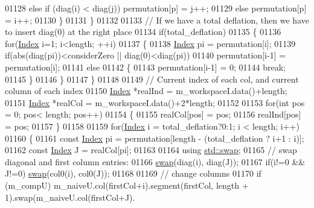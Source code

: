 \begin{DoxyCode}
01128         \textcolor{keywordflow}{else} \textcolor{keywordflow}{if} (diag(i) < diag(j)) permutation[p] = j++;
01129         \textcolor{keywordflow}{else}                        permutation[p] = i++;
01130       \}
01131     \}
01132     
01133     \textcolor{comment}{// If we have a total deflation, then we have to insert diag(0) at the right place}
01134     \textcolor{keywordflow}{if}(total\_deflation)
01135     \{
01136       \textcolor{keywordflow}{for}(\hyperlink{namespace_eigen_a62e77e0933482dafde8fe197d9a2cfde}{Index} i=1; i<length; ++i)
01137       \{
01138         \hyperlink{namespace_eigen_a62e77e0933482dafde8fe197d9a2cfde}{Index} pi = permutation[i];
01139         \textcolor{keywordflow}{if}(abs(diag(pi))<considerZero || diag(0)<diag(pi))
01140           permutation[i-1] = permutation[i];
01141         \textcolor{keywordflow}{else}
01142         \{
01143           permutation[i-1] = 0;
01144           \textcolor{keywordflow}{break};
01145         \}
01146       \}
01147     \}
01148     
01149     \textcolor{comment}{// Current index of each col, and current column of each index}
01150     \hyperlink{namespace_eigen_a62e77e0933482dafde8fe197d9a2cfde}{Index} *realInd = m\_workspaceI.data()+length;
01151     \hyperlink{namespace_eigen_a62e77e0933482dafde8fe197d9a2cfde}{Index} *realCol = m\_workspaceI.data()+2*length;
01152     
01153     \textcolor{keywordflow}{for}(\textcolor{keywordtype}{int} pos = 0; pos< length; pos++)
01154     \{
01155       realCol[pos] = pos;
01156       realInd[pos] = pos;
01157     \}
01158     
01159     \textcolor{keywordflow}{for}(\hyperlink{namespace_eigen_a62e77e0933482dafde8fe197d9a2cfde}{Index} i = total\_deflation?0:1; i < length; i++)
01160     \{
01161       \textcolor{keyword}{const} \hyperlink{namespace_eigen_a62e77e0933482dafde8fe197d9a2cfde}{Index} pi = permutation[length - (total\_deflation ? i+1 : i)];
01162       \textcolor{keyword}{const} \hyperlink{namespace_eigen_a62e77e0933482dafde8fe197d9a2cfde}{Index} J = realCol[pi];
01163       
01164       \textcolor{keyword}{using} \hyperlink{endian_8c_a3ca5ecd34b04d6a243c054ac3a57f68d}{std::swap};
01165       \textcolor{comment}{// swap diagonal and first column entries:}
01166       \hyperlink{endian_8c_a3ca5ecd34b04d6a243c054ac3a57f68d}{swap}(diag(i), diag(J));
01167       \textcolor{keywordflow}{if}(i!=0 && J!=0) \hyperlink{endian_8c_a3ca5ecd34b04d6a243c054ac3a57f68d}{swap}(col0(i), col0(J));
01168 
01169       \textcolor{comment}{// change columns}
01170       \textcolor{keywordflow}{if} (m\_compU) m\_naiveU.col(firstCol+i).segment(firstCol, length + 1).swap(m\_naiveU.col(firstCol+J).

\end{DoxyCode}
